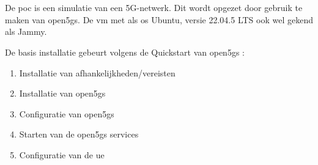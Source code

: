\chapter{}%
\label{ch:poc1}

De \gls{poc} is een simulatie van een 5G-netwerk. Dit wordt opgezet door gebruik te maken van \gls{open5gs}. De \gls{vm} met als \gls{os} Ubuntu, versie 22.04.5 LTS ook wel gekend als Jammy.

De basis installatie gebeurt volgens de Quickstart van \gls{open5gs} \textcite{Lee2025a}:

\begin{enumerate}
    \item Installatie van afhankelijkheden/vereisten
    \item Installatie van \gls{open5gs}
    \item Configuratie van \gls{open5gs}
    \item Starten van de \gls{open5gs} services
    \item Configuratie van de \gls{ue}
\end{enumerate}
